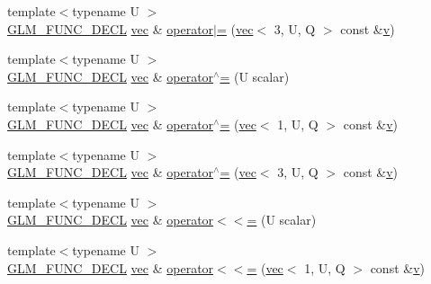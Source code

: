 \begin{DoxyCompactItemize}
\item 
{\footnotesize template$<$typename U $>$ }\\\hyperlink{setup_8hpp_ab2d052de21a70539923e9bcbf6e83a51}{G\+L\+M\+\_\+\+F\+U\+N\+C\+\_\+\+D\+E\+CL} \hyperlink{structglm_1_1vec}{vec} \& \hyperlink{structglm_1_1vec_3_013_00_01_t_00_01_q_01_4_a90a93293245e58f807968ae29f1c633a}{operator$\vert$=} (\hyperlink{structglm_1_1vec}{vec}$<$ 3, U, Q $>$ const \&\hyperlink{_s_d_l__opengl_8h_a10a82eabcb59d2fcd74acee063775f90}{v})
\item 
{\footnotesize template$<$typename U $>$ }\\\hyperlink{setup_8hpp_ab2d052de21a70539923e9bcbf6e83a51}{G\+L\+M\+\_\+\+F\+U\+N\+C\+\_\+\+D\+E\+CL} \hyperlink{structglm_1_1vec}{vec} \& \hyperlink{structglm_1_1vec_3_013_00_01_t_00_01_q_01_4_a697cfaf1caf704ec84ecee6a5677b2c8}{operator$^\wedge$=} (U scalar)
\item 
{\footnotesize template$<$typename U $>$ }\\\hyperlink{setup_8hpp_ab2d052de21a70539923e9bcbf6e83a51}{G\+L\+M\+\_\+\+F\+U\+N\+C\+\_\+\+D\+E\+CL} \hyperlink{structglm_1_1vec}{vec} \& \hyperlink{structglm_1_1vec_3_013_00_01_t_00_01_q_01_4_a9499879dc0557fa6b4ad14cd6a1372b9}{operator$^\wedge$=} (\hyperlink{structglm_1_1vec}{vec}$<$ 1, U, Q $>$ const \&\hyperlink{_s_d_l__opengl_8h_a10a82eabcb59d2fcd74acee063775f90}{v})
\item 
{\footnotesize template$<$typename U $>$ }\\\hyperlink{setup_8hpp_ab2d052de21a70539923e9bcbf6e83a51}{G\+L\+M\+\_\+\+F\+U\+N\+C\+\_\+\+D\+E\+CL} \hyperlink{structglm_1_1vec}{vec} \& \hyperlink{structglm_1_1vec_3_013_00_01_t_00_01_q_01_4_a8dd8004cf0cab42517c2cb6cb7f18461}{operator$^\wedge$=} (\hyperlink{structglm_1_1vec}{vec}$<$ 3, U, Q $>$ const \&\hyperlink{_s_d_l__opengl_8h_a10a82eabcb59d2fcd74acee063775f90}{v})
\item 
{\footnotesize template$<$typename U $>$ }\\\hyperlink{setup_8hpp_ab2d052de21a70539923e9bcbf6e83a51}{G\+L\+M\+\_\+\+F\+U\+N\+C\+\_\+\+D\+E\+CL} \hyperlink{structglm_1_1vec}{vec} \& \hyperlink{structglm_1_1vec_3_013_00_01_t_00_01_q_01_4_ab07f795306e494f77fd34b9540161461}{operator$<$$<$=} (U scalar)
\item 
{\footnotesize template$<$typename U $>$ }\\\hyperlink{setup_8hpp_ab2d052de21a70539923e9bcbf6e83a51}{G\+L\+M\+\_\+\+F\+U\+N\+C\+\_\+\+D\+E\+CL} \hyperlink{structglm_1_1vec}{vec} \& \hyperlink{structglm_1_1vec_3_013_00_01_t_00_01_q_01_4_a1325fb6cc79d8e3676e9b2be79c20df3}{operator$<$$<$=} (\hyperlink{structglm_1_1vec}{vec}$<$ 1, U, Q $>$ const \&\hyperlink{_s_d_l__opengl_8h_a10a82eabcb59d2fcd74acee063775f90}{v})

\end{DoxyCompactItemize}

